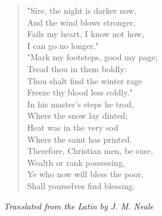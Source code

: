\begin{verse}
"Sire, the night is darker now,\\
\hspace*{2em}And the wind blows stronger;\\
Fails my heart, I know not how,\\
\hspace*{2em}I can go no longer."\\[0.7em]

"Mark my footsteps, good my page;\\
\hspace*{2em}Tread thou in them boldly:\\
Thou shalt find the winter rage\\
\hspace*{2em}Freeze thy blood less coldly."\\[0.7em]

In his master's steps he trod,\\
\hspace*{2em}Where the snow lay dinted;\\
Heat was in the very sod\\
\hspace*{2em}Where the saint has printed.\\[0.7em]

Therefore, Christian men, be sure,\\
\hspace*{2em}Wealth or rank possessing,\\
Ye who now will bless the poor,\\
\hspace*{2em}Shall yourselves find blessing.%
\end{verse}

\vspace{0.5\baselineskip}
\noindent\textit{Translated from the Latin by J. M. Neale}

\newpage
